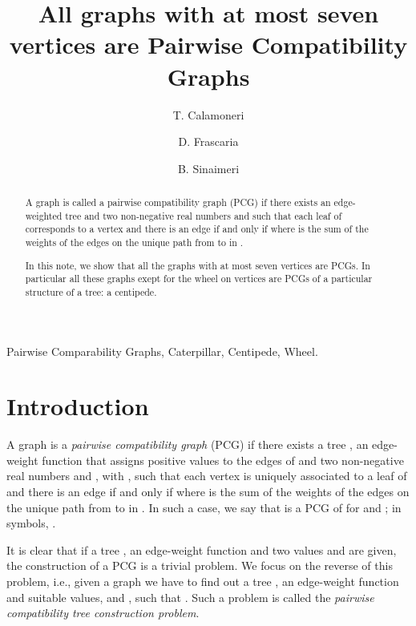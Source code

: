 \documentclass[review]{elsarticle}
\begin{document}
\begin{frontmatter}

\title{All graphs with at most seven vertices are Pairwise Compatibility Graphs}

\author[rvt]{T. Calamoneri}

\author[rvt]{D. Frascaria}

\author[rvt]{B. Sinaimeri}


\address[rvt]{Department of Computer Science, ``Sapienza'' University of Rome, Via Salaria 113, 00198 Roma, Italy}




\begin{abstract}
A graph  is called a pairwise compatibility graph (PCG) if there exists an edge-weighted tree  and two non-negative real numbers  and  such that each leaf  of  corresponds to a vertex  and there is an edge  if and only if  where  is the sum of the weights of the edges on the unique path from  to  in .  

In this note, we show that  all the graphs with at most seven vertices are PCGs.  In particular all these graphs  exept for the wheel on  vertices  are PCGs of a particular structure of a tree: a centipede. 
\end{abstract}

\begin{keyword} 
Pairwise Comparability Graphs,
Caterpillar,
Centipede,
Wheel.
\end{keyword}

\end{frontmatter}
\section{Introduction}


A graph  is a {\em pairwise compatibility graph} (PCG) if there exists a tree , an edge-weight function   that assigns positive values to the edges of  and  two non-negative real numbers  and , with , such that each vertex  is uniquely associated to a leaf  of  and there is an edge  if and only if  where  is the sum of the weights of the edges on the unique path from  to  in . In such a case, we say that  is a PCG of  for  and ; in symbols, .

It is clear that if a tree , an edge-weight function  and two values  and  are given, the construction of a PCG is a trivial problem. 
We focus on the reverse of this problem, i.e., given a graph  we have to find out a tree , an edge-weight function  and suitable values,  and , such that . Such a problem is called the {\em pairwise compatibility tree construction problem}.  
\end{document}
